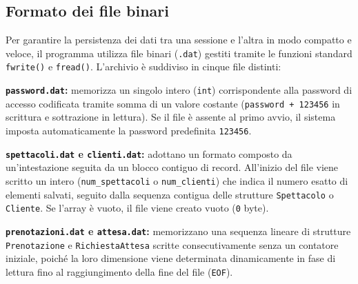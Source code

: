 \documentclass[11pt,a4paper,oneside,openany]{book}
\newenvironment{listacomp}{%
    \small
    \begin{list}{\textendash}{%
        \setlength{\topsep}{2pt}%
        \setlength{\partopsep}{0pt}%
        \setlength{\itemsep}{1pt}%
        \setlength{\parsep}{0pt}%
        \setlength{\leftmargin}{1.2em}%
    }%
}{%
    \end{list}%
}
\begin{document}
\subsection{Formato dei file binari}
Per garantire la persistenza dei dati tra una sessione e l'altra in modo compatto e veloce, il programma utilizza file binari (\texttt{.dat}) gestiti tramite le funzioni standard \texttt{fwrite()} e \texttt{fread()}. L'archivio è suddiviso in cinque file distinti:
\begin{listacomp}
    \item \textbf{\texttt{password.dat}:} memorizza un singolo intero (\texttt{int}) corrispondente alla password di accesso codificata tramite somma di un valore costante (\texttt{password + 123456} in scrittura e sottrazione in lettura). Se il file è assente al primo avvio, il sistema imposta automaticamente la password predefinita \texttt{123456}.
    \item \textbf{\texttt{spettacoli.dat} e \texttt{clienti.dat}:} adottano un formato composto da un'intestazione seguita da un blocco contiguo di record. All'inizio del file viene scritto un intero (\texttt{num\_spettacoli} o \texttt{num\_clienti}) che indica il numero esatto di elementi salvati, seguito dalla sequenza contigua delle strutture \texttt{Spettacolo} o \texttt{Cliente}. Se l'array è vuoto, il file viene creato vuoto (\texttt{0} byte).
    \item \textbf{\texttt{prenotazioni.dat} e \texttt{attesa.dat}:} memorizzano una sequenza lineare di strutture \texttt{Prenotazione} e \texttt{RichiestaAttesa} scritte consecutivamente senza un contatore iniziale, poiché la loro dimensione viene determinata dinamicamente in fase di lettura fino al raggiungimento della fine del file (\texttt{EOF}).
\end{listacomp}

\end{document}
